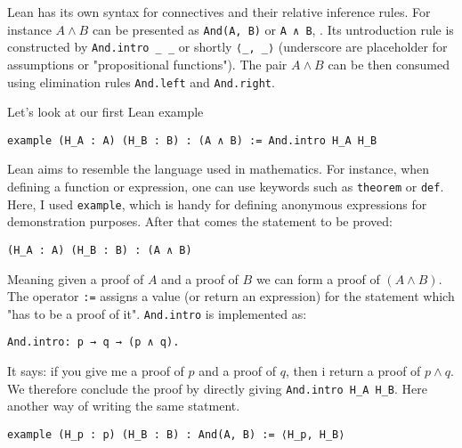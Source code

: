 Lean has its own syntax for connectives and their relative inference rules.
For instance $A \land B$ can be presented as \lstinline[language=lean]|And(A, B)| or \lstinline[language=lean]|A ∧ B|,
. Its untroduction rule is constructed by
 \lstinline[language=lean]|And.intro _ _| or shortly
 \lstinline[language=lean]|⟨_, _⟩| (underscore are placeholder for assumptions or "propositional functions"). 
 The pair $A \land B$ can be then consumed using elimination 
rules \lstinline[language=lean]|And.left| and \lstinline[language=lean]|And.right|.
\begin{example}\label{ex:conj_intro}
    Let's look at our first Lean example
  \begin{lstlisting}[language=lean]
    example (H_A : A) (H_B : B) : (A ∧ B) := And.intro H_A H_B
  \end{lstlisting}
Lean aims to resemble the language used in mathematics. 
For instance, when defining a function or expression, one can use keywords such as 
\lstinline[language=lean]|theorem| or \lstinline[language=lean]|def|.
Here, I used \lstinline[language=lean]|example|, which is handy for defining anonymous expressions 
for demonstration purposes. 
After that comes the statement to be proved:
\begin{lstlisting}[language=lean]
  (H_A : A) (H_B : B) : (A ∧ B) 
\end{lstlisting}
Meaning given a proof of $A$ and a proof of $B$ we can form a proof of $(A \land B)$.
The operator \lstinline[language=lean]|:=| assigns a value (or return an expression) for the statement which
 "has to be a proof of it".
\lstinline[language=lean]|And.intro| is implemented as:
\begin{lstlisting}[language=lean]
  And.intro: p → q → (p ∧ q).
\end{lstlisting}
It says: if you give me a proof of $p$ and a proof of $q$, 
then i return a proof of $p \land q$.
We therefore conclude the proof by directly giving 
\lstinline[language=lean]|And.intro H_A H_B|.
Here another way of writing the same statment.
\begin{lstlisting}[language=lean]
  example (H_p : p) (H_B : B) : And(A, B) := ⟨H_p, H_B⟩
\end{lstlisting}
\end{example}

